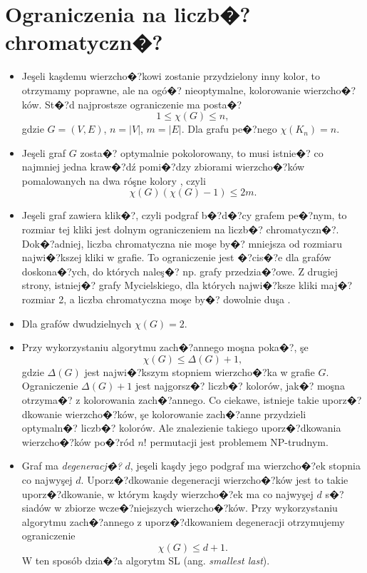 \documentclass[12pt,a4paper]{mwrep}
\begin{document}
\section{Ograniczenia na liczb�? chromatyczn�?}
\label{sec:chromatic_number_bounds}

\begin{itemize}
\item
Jeşeli kaşdemu wierzcho�?kowi zostanie przydzielony inny kolor,
to otrzymamy poprawne, ale na ogó�? nieoptymalne, kolorowanie 
wierzcho�?ków. St�?d najprostsze ograniczenie ma posta�?
\begin{equation}
1 \le \chi(G) \le n,
\end{equation}
gdzie $G=(V,E)$, $n=|V|$, $m=|E|$.
Dla grafu pe�?nego $\chi(K_n) = n$.
\item
Jeşeli graf $G$ zosta�? optymalnie pokolorowany, to musi istnie�?
co najmniej jedna kraw�?dź pomi�?dzy zbiorami wierzcho�?ków
pomalowanych na dwa róşne kolory
\cite{Wojciechowski}, czyli
\begin{equation}
\chi(G) (\chi(G)-1) \le 2m.
\end{equation}
\item
Jeşeli graf zawiera klik�?, czyli podgraf b�?d�?cy grafem pe�?nym,
to rozmiar tej kliki jest dolnym ograniczeniem na liczb�? 
chromatyczn�?. Dok�?adniej, liczba chromatyczna nie moşe by�?
mniejsza od rozmiaru najwi�?kszej kliki w grafie.
To ograniczenie jest �?cis�?e dla grafów doskona�?ych,
do których naleş�? np. grafy przedzia�?owe.
Z drugiej strony, istniej�? grafy Mycielskiego, dla których najwi�?ksze
kliki maj�? rozmiar 2, a liczba chromatyczna moşe by�? dowolnie duşa
\cite{wiki_Mycielskian}.
\item
Dla grafów dwudzielnych $\chi(G) = 2$.
\item
Przy wykorzystaniu algorytmu zach�?annego moşna poka�?, şe
\begin{equation}
\chi(G) \le \Delta(G) + 1,
\end{equation}
gdzie $\Delta(G)$ jest najwi�?kszym stopniem wierzcho�?ka w grafie $G$.
Ograniczenie $\Delta(G) + 1$ jest najgorsz�? liczb�? kolorów,
jak�? moşna otrzyma�? z kolorowania zach�?annego.
Co ciekawe, istnieje takie uporz�?dkowanie wierzcho�?ków, şe
kolorowanie zach�?anne przydzieli optymaln�? liczb�? kolorów.
Ale znalezienie takiego uporz�?dkowania wierzcho�?ków po�?ród $n!$
permutacji jest problemem NP-trudnym.
\item
Graf ma \emph{degeneracj�?} $d$, jeşeli kaşdy jego podgraf ma
wierzcho�?ek stopnia co najwyşej $d$.
Uporz�?dkowanie degeneracji wierzcho�?ków jest to takie uporz�?dkowanie,
w którym kaşdy wierzcho�?ek ma co najwyşej $d$ s�?siadów w zbiorze
wcze�?niejszych wierzcho�?ków.
Przy wykorzystaniu algorytmu zach�?annego z uporz�?dkowaniem degeneracji
otrzymujemy ograniczenie
\begin{equation}
\chi(G) \le d + 1.
\end{equation}
W ten sposób dzia�?a algorytm SL (ang. \emph{smallest last}).
\end{itemize}
\end{document}
